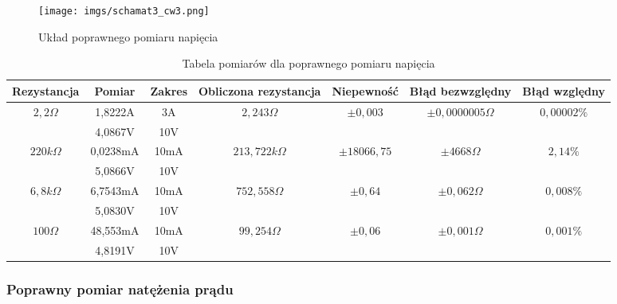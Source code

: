 \begin{figure}[!h]
    \centering
    \texttt{[image: imgs/schamat3\_cw3.png]}
    \caption{Układ poprawnego pomiaru napięcia}
    \label{fig:enter-label}
\end{figure}

\begin{table}[!ht]
    \centering
    \begin{tabular}{|c||c|c|c|c|c|c|} \hline
        Rezystancja                   & Pomiar   & Zakres & Obliczona rezystancja             & Niepewność & Błąd bezwzględny & Błąd względny \\ \hline
        \multirow{2}{*}{$2,2\Omega$}  & 1,8222A  & 3A     & \multirow{2}{*}{$2,243\Omega$}    & \multirow{2}{*}{$\pm 0,003$} &\multirow{2}{*}{$\pm 0,0000005\Omega$} & \multirow{2}{*}{$0,00002\%$}\\
                                      & 4,0867V  & 10V    &                                   & & & \\ \hline
        \multirow{2}{*}{$220k\Omega$} & 0,0238mA & 10mA   & \multirow{2}{*}{$213,722k\Omega$} & \multirow{2}{*}{$\pm 18066,75$} &\multirow{2}{*}{$\pm 4668\Omega$} & \multirow{2}{*}{$2,14\%$}\\
                                      & 5,0866V  & 10V    &                                   & & & \\ \hline
        \multirow{2}{*}{$6,8k\Omega$} & 6,7543mA & 10mA   & \multirow{2}{*}{$752,558\Omega$}  & \multirow{2}{*}{$\pm 0,64$} &\multirow{2}{*}{$\pm 0,062\Omega$} & \multirow{2}{*}{$0,008\%$} \\
                                      & 5,0830V  & 10V    &                                   & & & \\ \hline
        \multirow{2}{*}{$100\Omega$}  & 48,553mA & 10mA   & \multirow{2}{*}{$99,254\Omega$}   & \multirow{2}{*}{$\pm 0,06$} &\multirow{2}{*}{$\pm 0,001\Omega$} & \multirow{2}{*}{$0,001\%$}\\
                                      & 4,8191V  & 10V    &                                   & & & \\ \hline
    \end{tabular}
    \caption{Tabela pomiarów dla poprawnego pomiaru napięcia}
    \label{tab:my_label}
\end{table}

\subsubsection{Poprawny pomiar natężenia prądu}

